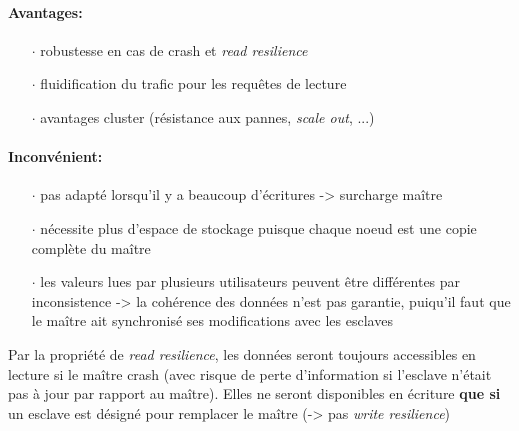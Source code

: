 {\paragraph{Avantages:}
\begin{itemize}
\item[$\cdot$]robustesse en cas de crash et \textit{read resilience}
\item[$\cdot$]fluidification du trafic pour les requêtes de lecture
\item[$\cdot$]avantages cluster (résistance aux pannes, \textit{scale out}, ...)
\end{itemize}

\paragraph{Inconvénient:}
\begin{itemize}
\item[$\cdot$]pas adapté lorsqu'il y a beaucoup d'écritures -> surcharge maître
\item[$\cdot$]nécessite plus d'espace de stockage puisque chaque noeud est une copie complète du maître
\item[$\cdot$]les valeurs lues par plusieurs utilisateurs peuvent être différentes par inconsistence -> la cohérence des données n'est pas garantie, puiqu'il faut que le maître ait synchronisé ses modifications avec les esclaves
\end{itemize}
}


\item{}
{\faux}
{Par la propriété de \textit{read resilience}, les données seront toujours accessibles en lecture si le maître crash (avec risque de perte d'information si l'esclave n'était pas à jour par rapport au maître). Elles ne seront disponibles en écriture \textbf{que si} un esclave est désigné pour remplacer le maître (-> pas \textit{write resilience})}


